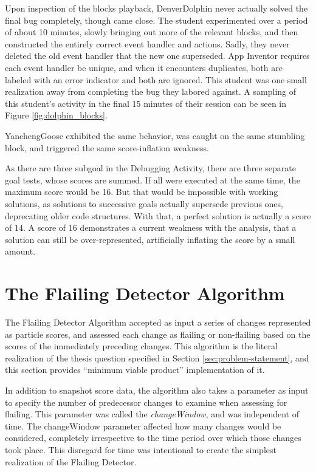 Upon inspection of the blocks playback, DenverDolphin never actually solved the final bug completely, though came close. The student experimented over a period of about 10 minutes, slowly bringing out more of the relevant blocks, and then constructed the entirely correct event handler and actions. Sadly, they never deleted the old event handler that the new one superseded. App Inventor requires each event handler be unique, and when it encounters duplicates, both are labeled with an error indicator and both are ignored. This student was one small realization away from completing the bug they labored against. A sampling of this student's activity in the final 15 minutes of their session can be seen in Figure \ref{fig:dolphin_blocks}. 

YanchengGoose exhibited the same behavior, was caught on the same stumbling block, and triggered the same score-inflation weakness. 

As there are three subgoal in the Debugging Activity, there are three separate goal tests, whose scores are summed. If all were executed at the same time, the maximum score would be 16. But that would be impossible with working solutions, as solutions to successive goals actually supersede previous ones, deprecating older code structures. With that, a perfect solution is actually a score of 14. A score of 16 demonstrates a current weakness with the analysis, that a solution can still be over-represented, artificially inflating the score by a small amount.




\section{The Flailing Detector Algorithm}
\label{sec:the-flailing-detector}
The Flailing Detector Algorithm accepted as input a series of changes represented as particle scores, and assessed each change as flailing or non-flailing based on the scores of the immediately preceding changes. This algorithm is the literal realization of the thesis question specified in Section \ref{sec:problem-statement}, and this section provides ``minimum viable product'' implementation of it.

In addition to snapshot score data, the algorithm also takes a parameter as input to specify the number of predecessor changes to examine when assessing for flailing. This parameter was called the \emph{changeWindow}, and was independent of time. The changeWindow parameter affected how many changes would be considered, completely irrespective to the time period over which those changes took place. This disregard for time was intentional to create the simplest realization of the Flailing Detector.

